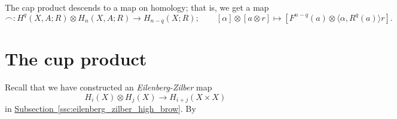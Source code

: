 \documentclass[main.tex]{subfiles}
\begin{document}
\begin{proposition}
  The cap product descends to a map on homology; that is, we get a map
  \begin{equation*}
    \frown\colon H^{q}(X, A; R) \otimes H_{n}(X, A; R) \to H_{n-q}(X; R); \qquad [\alpha] \otimes [a \otimes r] \mapsto [F^{n-q}(a) \otimes \langle \alpha, R^{q}(a) \rangle r].
  \end{equation*}
\end{proposition}

\section{The cup product}
\label{sec:the_cup_product}

Recall that we have constructed an \emph{Eilenberg-Zilber} map
\begin{equation*}
  H_{i}(X) \otimes H_{j}(X) \to H_{i+j}(X \times X)
\end{equation*}
in \hyperref[ssc:eilenberg_zilber_high_brow]{Subsection~\ref*{ssc:eilenberg_zilber_high_brow}}. By
\end{document}
